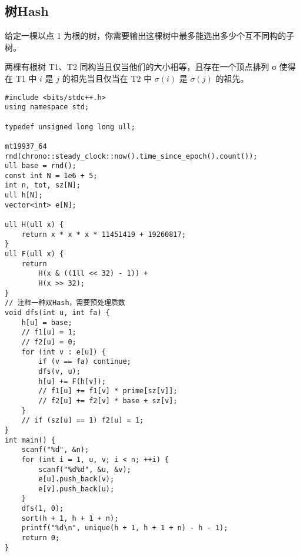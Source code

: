\subsection{树Hash}
\begin{tcolorbox}
\par \noindent 给定一棵以点 1 为根的树，你需要输出这棵树中最多能选出多少个互不同构的子树。
~\\
\par \noindent 两棵有根树 T1、T2 同构当且仅当他们的大小相等，且存在一个顶点排列 σ 使得在 T1 中 $i$ 是 $j$ 的祖先当且仅当在 T2 中 $σ(i)$ 是 $σ(j)$ 的祖先。
\end{tcolorbox}
\begin{verbatim}
#include <bits/stdc++.h>
using namespace std;

typedef unsigned long long ull;

mt19937_64 rnd(chrono::steady_clock::now().time_since_epoch().count());
ull base = rnd();
const int N = 1e6 + 5;
int n, tot, sz[N];
ull h[N];
vector<int> e[N];

ull H(ull x) {
    return x * x * x * 11451419 + 19260817;
}
ull F(ull x) {
    return
        H(x & ((1ll << 32) - 1)) +
        H(x >> 32);
}
// 注释一种双Hash，需要预处理质数
void dfs(int u, int fa) {
    h[u] = base;
    // f1[u] = 1;
    // f2[u] = 0;
    for (int v : e[u]) {
        if (v == fa) continue;
        dfs(v, u);
        h[u] += F(h[v]);
        // f1[u] += f1[v] * prime[sz[v]];
        // f2[u] += f2[v] * base + sz[v];
    }
    // if (sz[u] == 1) f2[u] = 1;
}
int main() {
    scanf("%d", &n);
    for (int i = 1, u, v; i < n; ++i) {
        scanf("%d%d", &u, &v);
        e[u].push_back(v);
        e[v].push_back(u);
    }
    dfs(1, 0);
    sort(h + 1, h + 1 + n);
    printf("%d\n", unique(h + 1, h + 1 + n) - h - 1);
    return 0;
}
\end{verbatim}